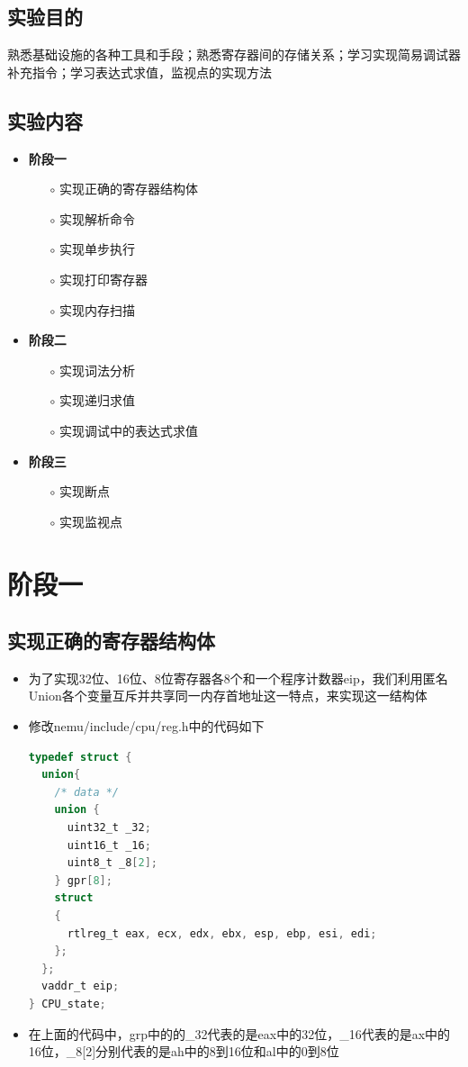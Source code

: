 \documentclass[UTF8,a4paper,10pt]{ctexart}
\begin{document}
\subsection{实验目的}
熟悉基础设施的各种工具和手段；熟悉寄存器间的存储关系；学习实现简易调试器
补充指令；学习表达式求值，监视点的实现方法
\subsection{实验内容}
\begin{itemize}
  \item \textbf{阶段一}
  \begin{itemize}
    \item [$\circ $] 实现正确的寄存器结构体
    \item [$\circ $] 实现解析命令
    \item [$\circ $] 实现单步执行
    \item [$\circ $] 实现打印寄存器
    \item [$\circ $] 实现内存扫描
  \end{itemize}
  \item \textbf{阶段二}
  \begin{itemize}
    \item [$\circ $] 实现词法分析
    \item [$\circ $] 实现递归求值
    \item [$\circ $] 实现调试中的表达式求值
  \end{itemize}
  \item \textbf{阶段三}
  \begin{itemize}
    \item [$\circ $] 实现断点
    \item [$\circ $] 实现监视点
  \end{itemize}
\end{itemize}
\section{阶段一}
\subsection{实现正确的寄存器结构体}
\begin{itemize}
  \item 为了实现32位、16位、8位寄存器各8个和一个程序计数器eip，我们利用匿名Union各个变量互斥并共享同一内存首地址这一特点，来实现这一结构体
  \item 修改nemu/include/cpu/reg.h中的代码如下
  \begin{lstlisting}[language = C]    
typedef struct {
  union{
    /* data */
    union {
      uint32_t _32;
      uint16_t _16;
      uint8_t _8[2];
    } gpr[8];
    struct 
    {
      rtlreg_t eax, ecx, edx, ebx, esp, ebp, esi, edi;
    };
  };
  vaddr_t eip;
} CPU_state;
  \end{lstlisting}
  \item 在上面的代码中，grp中的的\_32代表的是eax中的32位，\_16代表的是ax中的16位，\_8[2]分别代表的是ah中的8到16位和al中的0到8位
\end{itemize}
\end{document}
